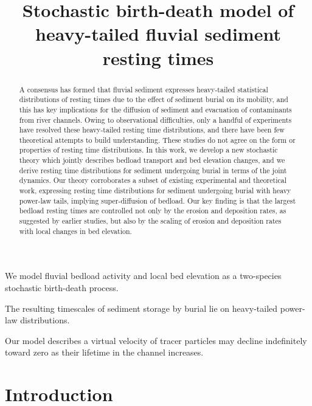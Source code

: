\documentclass[draft]{agujournal2018}
\begin{document}
\title{Stochastic birth-death model of heavy-tailed fluvial sediment resting times}

\begin{keypoints}
\item We model fluvial bedload activity and local bed elevation as a two-species stochastic birth-death process.
\item The resulting timescales of sediment storage by burial lie on heavy-tailed power-law distributions. 
\item Our model describes a virtual velocity of tracer particles may decline indefinitely toward zero as their lifetime in the channel increases.
\end{keypoints}

\begin{abstract}
A consensus has formed that fluvial sediment expresses heavy-tailed statistical distributions of resting times due to the effect of sediment burial on its mobility, and this has key implications for the diffusion of sediment and evacuation of contaminants from river channels.
Owing to observational difficulties, only a handful of experiments have resolved these heavy-tailed resting time distributions, and there have been few theoretical attempts to build understanding.
These studies do not agree on the form or properties of resting time distributions.
In this work, we develop a new stochastic theory which jointly describes bedload transport and bed elevation changes, and we derive resting time distributions for sediment undergoing burial in terms of the joint dynamics.
Our theory corroborates a subset of existing experimental and theoretical work, expressing resting time distributions for sediment undergoing burial with heavy power-law tails, implying super-diffusion of bedload.
Our key finding is that the largest bedload resting times are controlled not only by the erosion and deposition rates, as suggested by earlier studies, but also by the scaling of erosion and deposition rates with local changes in bed elevation.
\end{abstract} 

\section{Introduction}
\end{document}
